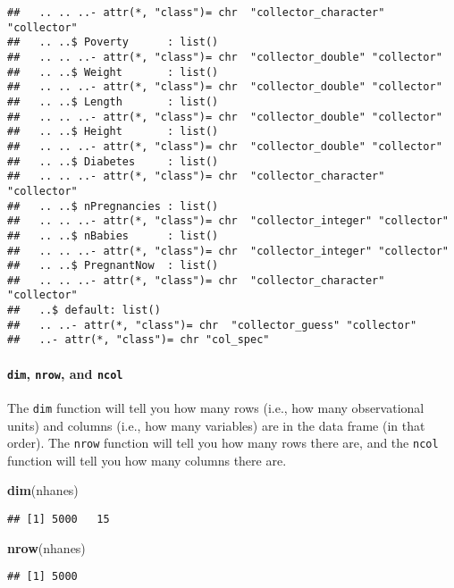 \documentclass[]{article}
\newenvironment{Shaded}{\begin{snugshade}}{\end{snugshade}}
\newcommand{\KeywordTok}[1]{\textcolor[rgb]{0.13,0.29,0.53}{\textbf{#1}}}
\newcommand{\NormalTok}[1]{#1}
\let\oldparagraph\paragraph
\renewcommand{\paragraph}[1]{\oldparagraph{#1}\mbox{}}
\begin{document}
\begin{verbatim}
##   .. .. ..- attr(*, "class")= chr  "collector_character" "collector"
##   .. ..$ Poverty      : list()
##   .. .. ..- attr(*, "class")= chr  "collector_double" "collector"
##   .. ..$ Weight       : list()
##   .. .. ..- attr(*, "class")= chr  "collector_double" "collector"
##   .. ..$ Length       : list()
##   .. .. ..- attr(*, "class")= chr  "collector_double" "collector"
##   .. ..$ Height       : list()
##   .. .. ..- attr(*, "class")= chr  "collector_double" "collector"
##   .. ..$ Diabetes     : list()
##   .. .. ..- attr(*, "class")= chr  "collector_character" "collector"
##   .. ..$ nPregnancies : list()
##   .. .. ..- attr(*, "class")= chr  "collector_integer" "collector"
##   .. ..$ nBabies      : list()
##   .. .. ..- attr(*, "class")= chr  "collector_integer" "collector"
##   .. ..$ PregnantNow  : list()
##   .. .. ..- attr(*, "class")= chr  "collector_character" "collector"
##   ..$ default: list()
##   .. ..- attr(*, "class")= chr  "collector_guess" "collector"
##   ..- attr(*, "class")= chr "col_spec"
\end{verbatim}

\paragraph{\texorpdfstring{\texttt{dim}, \texttt{nrow}, and
\texttt{ncol}}{dim, nrow, and ncol}}\label{dim-nrow-and-ncol}

The \texttt{dim} function will tell you how many rows (i.e., how many
observational units) and columns (i.e., how many variables) are in the
data frame (in that order). The \texttt{nrow} function will tell you how
many rows there are, and the \texttt{ncol} function will tell you how
many columns there are.

\begin{Shaded}
\begin{Highlighting}[]
\KeywordTok{dim}\NormalTok{(nhanes)}
\end{Highlighting}
\end{Shaded}

\begin{verbatim}
## [1] 5000   15
\end{verbatim}

\begin{Shaded}
\begin{Highlighting}[]
\KeywordTok{nrow}\NormalTok{(nhanes)}
\end{Highlighting}
\end{Shaded}

\begin{verbatim}
## [1] 5000
\end{verbatim}
\end{document}
